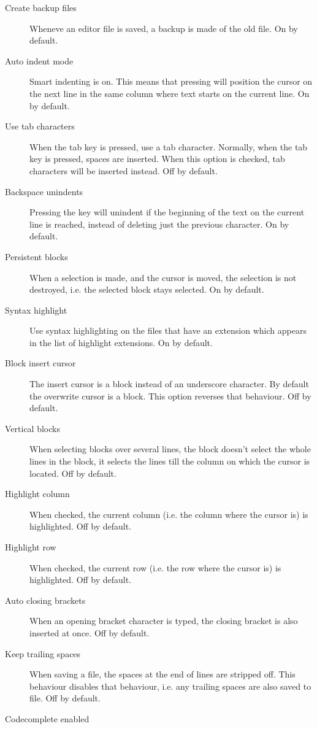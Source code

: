 \begin{description}
\item[Create backup files]
Wheneve an editor file is saved, a backup is made of the old file. On by
default.
\item[Auto indent mode] 
Smart indenting is on. This means that pressing  will position the 
cursor on the next line in the same column where text starts on the current
line. On by default.
\item[Use tab characters] 
When the tab key is pressed, use a tab character. Normally, when the tab key
is pressed, spaces are inserted. When this option is checked, tab characters 
will be inserted instead. Off by default.
\item[Backspace unindents]
Pressing the  key will unindent if the beginning of the text on
the current line is reached, instead of deleting just the previous
character. On by default.
\item[Persistent blocks]
When a selection is made, and the cursor is moved, the selection is not
destroyed, i.e. the selected block stays selected. On by default. 
\item[Syntax highlight]
Use syntax highlighting on the files that have an extension which appears in
the list of highlight extensions. On by default.
\item[Block insert cursor]
The insert cursor is a block instead of an underscore character. By default
the overwrite cursor is a block. This option reverses that behaviour. Off by
default.
\item[Vertical blocks]
When selecting blocks over several lines, the block doesn't select the whole
lines in the block, it selects the lines till the column on which the cursor
is located. Off by default.
\item[Highlight column]
When checked, the current column (i.e. the column where the cursor is) is
highlighted. Off by default.
\item[Highlight row]
When checked, the current row (i.e. the row where the cursor is) is
highlighted. Off by default.
\item[Auto closing brackets]
When an opening bracket character is typed, the closing bracket is also
inserted at once. Off by default.
\item[Keep trailing spaces]
When saving a file, the spaces at the end of lines are stripped off. This
behaviour disables that behaviour, i.e. any trailing spaces are also saved
to file. Off by default.
\item[Codecomplete enabled]

\end{description}
